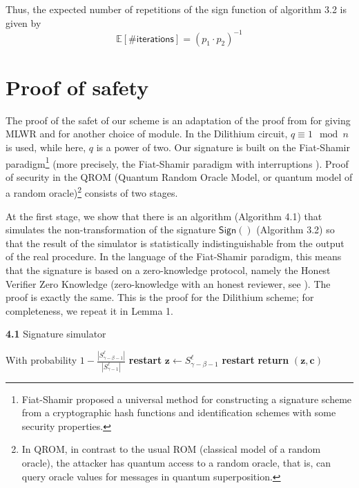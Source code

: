 \documentclass{article}
\theoremstyle{plain}
\theoremstyle{definition}
\begin{document}
    Thus, the expected number of repetitions of the sign function of algorithm 3.2 is given by
    \begin{equation}
    \mathbb{E}[\mathsf{\#iterations}] = (p_1 \cdot p_2)^{-1}
    \end{equation}

    \section{Proof of safety}
    \label{sec:proof}

    The proof of the safet of our scheme is an adaptation of the proof from  \cite{DKL+18, KLS18} for giving MLWR and for another choice of module. In the Dilithium circuit, $q \equiv 1 \mod n$ is used, while here, $q$ is a power of two. Our signature is built on the Fiat-Shamir paradigm\footnote{Fiat-Shamir proposed a universal method for constructing a signature scheme from a cryptographic hash functions and identification schemes with some security properties.} (more precisely, the Fiat-Shamir paradigm with interruptions \cite{Lyu09}). Proof of security in the QROM (Quantum Random Oracle Model, or quantum model of a random oracle)\footnote{In QROM, in contrast to the usual ROM (classical model of a random oracle), the attacker has quantum access to a random oracle, that is, can query oracle values for messages in quantum superposition.} consists of two stages.

    At the first stage, we show that there is an algorithm (Algorithm 4.1) that simulates the non-transformation of the signature $\mathsf{Sign}()$ (Algorithm 3.2) so that the result of the simulator is statistically indistinguishable from the output of the real procedure. In the language of the Fiat-Shamir paradigm, this means that the signature is based on a zero-knowledge protocol, namely the Honest Verifier Zero Knowledge (zero-knowledge with an honest reviewer, see \cite{KLS18}). The proof is exactly the same. This is the proof for the Dilithium scheme; for completeness, we repeat it in Lemma 1.

    \begin{algorithm}
        \renewcommand{\thealgorithm}{}
        \caption{\textbf{4.1} Signature simulator}
        \begin{algorithmic}[1]
            \Statex{}
            \State With probability $1 - \frac{|S^{\ell}_{\gamma - \beta - 1}|}{|S^{\ell}_{\gamma -1}|}$ \textbf{restart}
            \State $\mathbf{z} \gets S^{\ell}_{\gamma - \beta - 1}$
                \State \textbf{restart}
            \Else
                \State \textbf{return} $(\mathbf{z}, \mathbf{c})$
            \EndIf
        \end{algorithmic}
    \end{algorithm}
\end{document}
